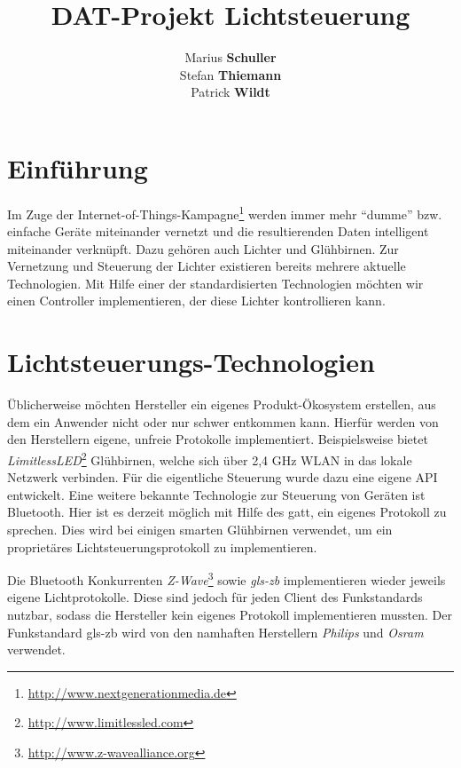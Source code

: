 \documentclass[a4paper,12pt]{article}
\begin{document}
\title{DAT-Projekt Lichtsteuerung}
\author{Marius \textbf{Schuller}\\
        Stefan \textbf{Thiemann}\\
		Patrick \textbf{Wildt}}
\maketitle

\newpage

\tableofcontents

\onehalfspacing

\newpage

\section{Einführung}
\label{einfuehrung}

Im Zuge der Internet-of-Things-Kampagne\footnote{\url{http://www.nextgenerationmedia.de}}
werden immer mehr ``dumme'' bzw. einfache Geräte miteinander vernetzt und die
resultierenden Daten intelligent miteinander verknüpft. Dazu gehören auch Lichter und
Glühbirnen. Zur Vernetzung und Steuerung der Lichter existieren bereits mehrere
aktuelle Technologien. Mit Hilfe einer der standardisierten Technologien möchten wir
einen Controller implementieren, der diese Lichter kontrollieren kann.

\section{Lichtsteuerungs-Technologien}
\label{technology}

Üblicherweise möchten Hersteller ein eigenes Produkt-Ökosystem erstellen, aus dem ein
Anwender nicht oder nur schwer entkommen kann. Hierfür werden von den Herstellern
eigene, unfreie Protokolle implementiert. Beispielsweise bietet
\textit{LimitlessLED}\footnote{\url{http://www.limitlessled.com}} Glühbirnen, welche sich
über 2,4 GHz WLAN in das lokale Netzwerk verbinden. Für die eigentliche
Steuerung wurde dazu eine eigene API entwickelt. Eine weitere bekannte Technologie
zur Steuerung von Geräten ist Bluetooth. Hier ist es derzeit möglich
mit Hilfe des \gls{gatt}, ein eigenes Protokoll zu sprechen. Dies wird bei einigen
smarten Glühbirnen verwendet, um ein proprietäres Lichtsteuerungsprotokoll zu implementieren.

Die Bluetooth Konkurrenten \textit{Z-Wave}\footnote{\url{http://www.z-wavealliance.org}} sowie
\textit{\gls{gls-zb}} implementieren wieder jeweils eigene Lichtprotokolle. Diese
sind jedoch für jeden Client des Funkstandards nutzbar, sodass die Hersteller kein
eigenes Protokoll implementieren mussten. Der Funkstandard \gls{gls-zb} wird
von den namhaften Herstellern \textit{Philips} und \textit{Osram} verwendet.
\end{document}

